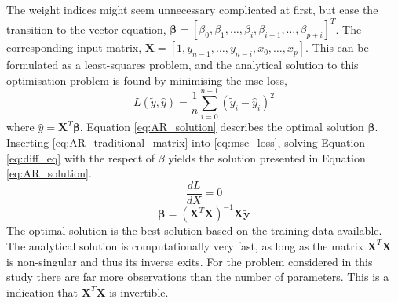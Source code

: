 The weight indices might seem unnecessary complicated at first, but ease the transition to the vector equation, $\mathbf{\beta} = [\beta_0, \beta_1, \ldots, \beta_i, \beta_{i+1}, \ldots, \beta_{p+i}]^T$. The corresponding input matrix, $\mathbf{X} = [1, y_{n-1}, \ldots, y_{n-i}, x_0, \ldots, x_p]$. 
This can be formulated as a least-squares problem, and the analytical solution to this optimisation problem is found by minimising the \acrfull{mse} loss, 
\begin{equation} \label{eq:mse_loss}
    L (\tilde{y}, \hat{y}) = \frac{1}{n} \sum_{i=0}^{n-1}(\tilde{y}_i-\hat{y}_i)^2
\end{equation} 
where $\hat{y} = \mathbf{X}^T \mathbf{\beta}$. Equation \eqref{eq:AR_solution} describes the optimal solution $\mathbf{\beta}$. Inserting \eqref{eq:AR_traditional_matrix} into \eqref{eq:mse_loss}, solving Equation \eqref{eq:diff_eq} with the respect of $\beta$ yields the solution presented in Equation \eqref{eq:AR_solution}.  
\begin{equation} \label{eq:diff_eq}
    \frac{dL}{dX} = 0
\end{equation}
\begin{equation} \label{eq:AR_solution}
    \mathbf{\beta}  = \left( \mathbf{X}^T\mathbf{X}\right)^{-1} \mathbf{X}\tilde{\mathbf{y}}
\end{equation}
The optimal solution is the best solution based on the training data available. The analytical solution is computationally very fast, as long as the matrix $\mathbf{X}^T\mathbf{X}$ is non-singular and thus its inverse exits. For the problem considered in this study there are far more observations than the number of parameters. This is a indication that $\mathbf{X}^T\mathbf{X}$ is invertible. %



